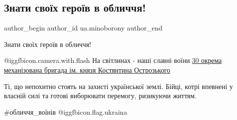  
 
 
 
 
 
\subsection{Знати своїх героїв в обличчя!}
\label{sec:27_05_2022.fb.ua.minoborony.1.znaty_geroiv}
 
\ifcmt
 author_begin
   author_id ua.minoborony
 author_end
\fi

Знати своїх героїв в обличчя!

@igg{fbicon.camera.with.flash} На світлинах - наші славні воїни
\href{https://www.facebook.com/30brigade}{30 окрема механізована бригада ім.
князя Костянтина Острозького}


Ті, що непохитно стоять на захисті української землі. Бійці, котрі впевнені у
власній силі та готові виборювати перемогу, ризикуючи життям. 

\#обличчя\_воїнів @igg{fbicon.flag.ukraina}

